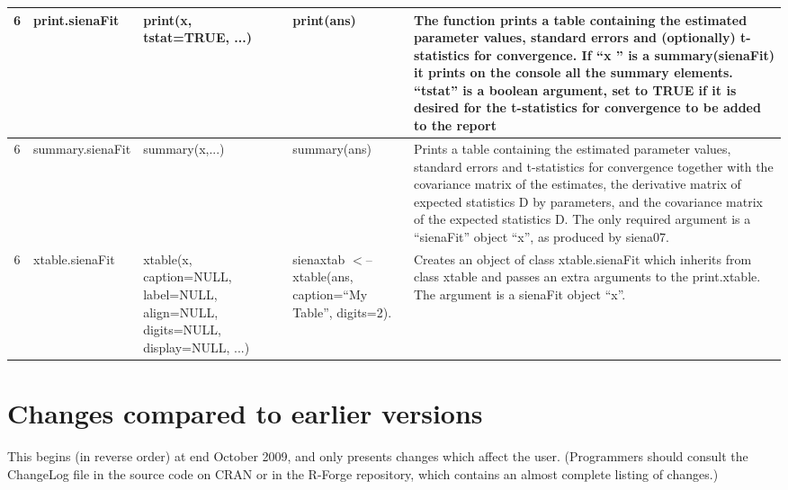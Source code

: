 \documentclass[a4paper,fleqn,11pt]{article}
\newcommand{\+}{\, + \,}
\newcommand{\sfn}[1]{\textsf{#1}}
\begin{document}
{\begin{landscape}
\begin{small}
\begin{longtable}{c | p{2.4cm} | p{4.5cm} | p{4.0cm} | p{9.0cm} }
6 & print.sienaFit & print(x, tstat=TRUE, ...) & print(ans) & The function
prints a table containing the estimated parameter values, standard errors and
(optionally) t-statistics for convergence. If ``x '' is a summary(sienaFit) it
prints on the console all the summary elements. ``tstat'' is a boolean
argument, set to TRUE if it is desired for the t-statistics for convergence to
be added to the report\\
\hline

6 & summary.sienaFit & summary(x,...) & summary(ans) & Prints a table
containing the estimated parameter values, standard errors and t-statistics for
convergence together with the covariance matrix of the estimates, the
derivative matrix of expected statistics D by parameters, and the covariance
matrix of the expected statistics D.  The only required argument is a
``sienaFit'' object ``x'', as produced by  siena07.\\
\hline

6 & xtable.sienaFit & xtable(x, caption=NULL, \newline
label=NULL, align=NULL, \newline
digits=NULL,\newline
 display=NULL, ...) & sienaxtab $<$-- \newline
 xtable(ans, \newline
caption=``My
Table'', \newline
digits=2).  &Creates an object of class xtable.sienaFit which inherits
from class xtable and passes an extra arguments to the print.xtable.
The argument is a sienaFit object ``x''. \\
\hline


\end{longtable}
\end{small}
\end{landscape}


%



\section{Changes compared to earlier versions}

This begins (in reverse order) at end October 2009, and only presents changes
which affect the user.
(Programmers should consult the \sfn{ChangeLog} file in the source code on CRAN or in
the R-Forge repository, which contains an almost complete listing of changes.)
\begin{small}
\begin{itemize} %


\end{itemize}
\end{small}}
\end{document}
